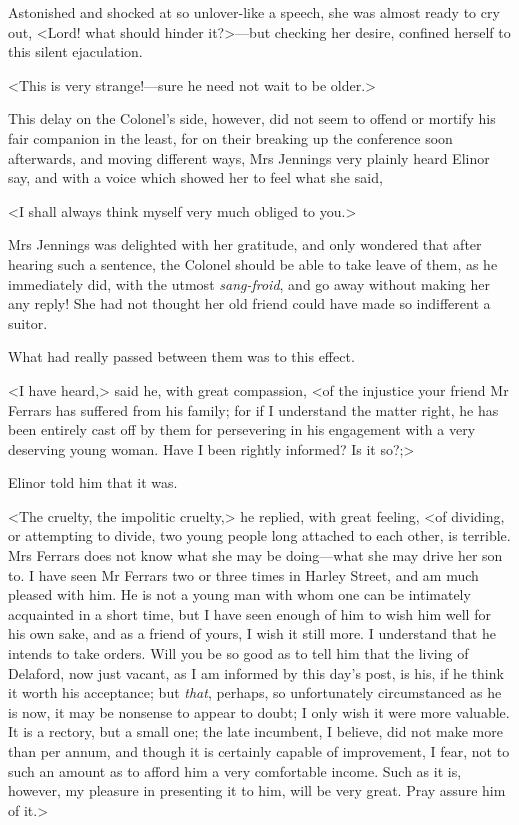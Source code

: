 Astonished and shocked at so unlover-like a speech, she was almost ready to cry out, <Lord! what should hinder it?>—but checking her desire, confined herself to this silent ejaculation.

<This is very strange!—sure he need not wait to be older.>

This delay on the Colonel's side, however, did not seem to offend or mortify his fair companion in the least, for on their breaking up the conference soon afterwards, and moving different ways, Mrs Jennings very plainly heard Elinor say, and with a voice which showed her to feel what she said,

<I shall always think myself very much obliged to you.>

Mrs Jennings was delighted with her gratitude, and only wondered that after hearing such a sentence, the Colonel should be able to take leave of them, as he immediately did, with the utmost \textit{sang-froid}, and go away without making her any reply! She had not thought her old friend could have made so indifferent a suitor.

What had really passed between them was to this effect.

<I have heard,> said he, with great compassion, <of the injustice your friend Mr Ferrars has suffered from his family; for if I understand the matter right, he has been entirely cast off by them for persevering in his engagement with a very deserving young woman. Have I been rightly informed? Is it so?;>

Elinor told him that it was.

<The cruelty, the impolitic cruelty,> he replied, with great feeling, <of dividing, or attempting to divide, two young people long attached to each other, is terrible. Mrs Ferrars does not know what she may be doing—what she may drive her son to. I have seen Mr Ferrars two or three times in Harley Street, and am much pleased with him. He is not a young man with whom one can be intimately acquainted in a short time, but I have seen enough of him to wish him well for his own sake, and as a friend of yours, I wish it still more. I understand that he intends to take orders. Will you be so good as to tell him that the living of Delaford, now just vacant, as I am informed by this day's post, is his, if he think it worth his acceptance; but \textit{that}, perhaps, so unfortunately circumstanced as he is now, it may be nonsense to appear to doubt; I only wish it were more valuable. It is a rectory, but a small one; the late incumbent, I believe, did not make more than  per annum, and though it is certainly capable of improvement, I fear, not to such an amount as to afford him a very comfortable income. Such as it is, however, my pleasure in presenting it to him, will be very great. Pray assure him of it.>

